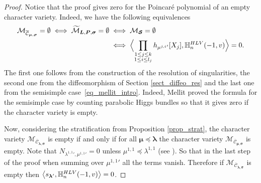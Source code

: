 \documentclass[11pt]{article}
\newcommand{\HLV}{\textup{HLV}}
\theoremstyle{definition}
\theoremstyle{plain}
\newcommand{\mcmus}{\mathcal{M}_{\overline{\mathcal{C}}_{\boldsymbol{\mu},\boldsymbol{\sigma}}}}
\newcommand{\mlps}{\widetilde{\mathcal{M}}_{\boldsymbol{L},\boldsymbol{P},\boldsymbol{\sigma}}}
\begin{document}
\begin{proof}
Notice that the proof gives zero for the Poincaré polynomial of an empty character variety. Indeed, we have the following equivalences
\begin{align*}
\mcmus = \emptyset \iff \mlps = \emptyset &\iff \mathcal{M}_{\boldsymbol{\mathcal{S}}} = \emptyset \\
&\iff \Bigl\langle \prod_{\substack{1 \le j \le k \\ 1 \le i \le l_j}} h_{ {\mu^{j,i}}'}[X_j],\mathbb{H}_n^{\HLV}(-1,v)\Bigr\rangle = 0.
\end{align*}
The first one follows from the construction of the resolution of singularities, the second one from the diffeomorphism of Section \ref{sect_diffeo_res} and the last one from the semisimple case~\eqref{eq_mellit_intro}. Indeed, Mellit proved the formula for the semisimple case by counting parabolic Higgs bundles so that it gives zero if the character variety is empty.

Now, considering the stratification from Proposition \ref{prop_strat}, the character variety $\mathcal{M}_{\overline{\mathcal{C}}_{\boldsymbol{\lambda},\boldsymbol{\sigma}}}$ is empty if and only if for all $\boldsymbol{\mu} \preceq \boldsymbol{\lambda}$ the character variety $\mcmus$ is empty. Note that $N_{{\lambda^{1,1}}',{\mu^{1,1}}'} = 0$ unless $\mu^{1,1} \preceq \lambda^{1,1} $ (see \cite[I-6]{Macdonald}). So that in the last step of the proof when summing over ${\mu^{1,1}}'$ all the terms vanish. Therefore if $\mathcal{M}_{\overline{\mathcal{C}}_{\boldsymbol{\lambda},\boldsymbol{\sigma}}}$ is empty then $\left\langle s_{\boldsymbol{\lambda}'}, \mathbb{H}_n^{\HLV}(-1,v)\right\rangle = 0$.
\end{proof}
\end{document}
